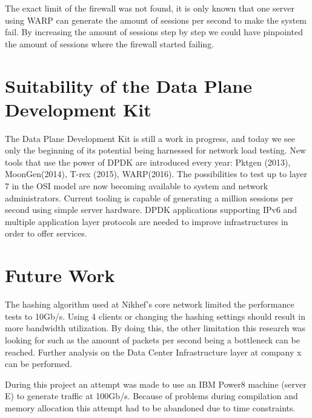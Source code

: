 The exact limit of the firewall was not found, it is only known that one server using WARP can generate the amount of sessions per second to make the system fail.
By increasing the amount of sessions step by step we could have pinpointed the amount of sessions where the firewall started failing.


\section{Suitability of the Data Plane Development Kit}
The Data Plane Development Kit is still a work in progress, and today we see only the beginning of its potential being harnessed for network load testing. New tools that use the power of DPDK are introduced every year:
Pktgen (2013), MoonGen(2014), T-rex (2015), WARP(2016).
The possibilities to test up to layer 7 in the OSI model are now becoming available to system and network administrators. 
Current tooling is capable of generating a million sessions per second using simple server hardware. 
DPDK applications supporting IPv6 and multiple application layer protocols are needed to improve infrastructures in order to offer services. 

\section{Future Work}
The hashing algorithm used at Nikhef's core network limited the performance tests to 10Gb/s. Using 4 clients or changing the hashing settings should result in more bandwidth utilization. 
By doing this, the other limitation this research was looking for such as the amount of packets per second being a bottleneck can be reached. Further analysis on the Data Center Infrastructure layer at company x can be performed. 

During this project an attempt was  made to use an IBM Power8 machine (server E) to generate traffic at 100Gb/s. Because of problems during compilation and memory allocation this attempt had to be abandoned due to time constraints.

